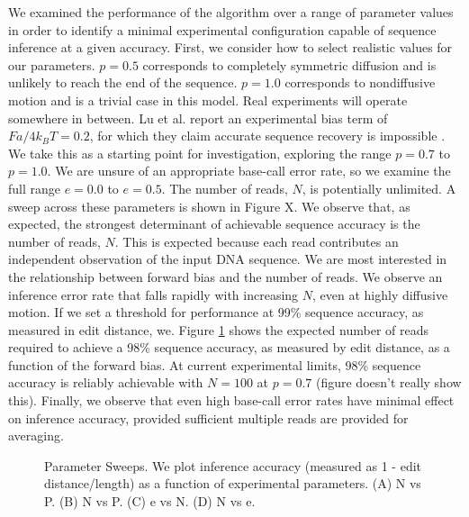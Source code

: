 \documentclass{biophys_letter}
\begin{document}
We examined the performance of the algorithm over a range of parameter values in order to identify a minimal experimental configuration capable of sequence inference at a given accuracy.
First, we consider how to select realistic values for our parameters.
$p=0.5$ corresponds to completely symmetric diffusion and is unlikely to reach the end of the sequence.
$p=1.0$ corresponds to nondiffusive motion and is a trivial case in this model.
Real experiments will operate somewhere in between.
Lu et al. report an experimental bias term of $Fa/4k_{B}T=0.2$, for which they claim accurate sequence recovery is impossible \cite{Lu:2011}.
We take this as a starting point for investigation, exploring the range $p=0.7$ to $p=1.0$.
We are unsure of an appropriate base-call error rate, so we examine the full range $e=0.0$ to $e=0.5$.
The number of reads, $N$, is potentially unlimited.
A sweep across these parameters is shown in Figure X.
We observe that, as expected, the strongest determinant of achievable sequence accuracy is the number of reads, $N$.
This is expected because each read contributes an independent observation of the input DNA sequence.
We are most interested in the relationship between forward bias and the number of reads.
We observe an inference error rate that falls rapidly with increasing $N$, even at highly diffusive motion. 
If we set a threshold for performance at 99\% sequence accuracy, as measured in edit distance, we.
Figure \ref{fig:parameter_sweeps} shows the expected number of reads required to achieve a 98\% sequence accuracy, as measured by edit distance, as a function of the forward bias.
At current experimental limits, 98\% sequence accuracy is reliably achievable with $N=100$ at $p=0.7$ (figure doesn't really show this).
Finally, we observe that even high base-call error rates have minimal effect on inference accuracy, provided sufficient multiple reads are provided for averaging.

\begin{figure}%
\caption{Parameter Sweeps. We plot inference accuracy (measured as 1 - edit distance/length) as a function of experimental parameters. (A) N vs P. (B) N vs P. (C) e vs N. (D) N vs e.}
\label{fig:parameter_sweeps}
\end{figure}
\end{document}
